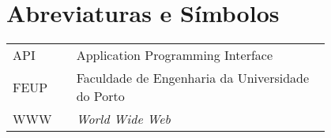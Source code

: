 \chapter*{Abreviaturas e Símbolos}

\begin{flushleft}
\begin{tabular}{l p{0.8\linewidth}}
API      & Application Programming Interface\\
FEUP     & Faculdade de Engenharia da Universidade do Porto\\
WWW      & \emph{World Wide Web}
\end{tabular}
\end{flushleft}

